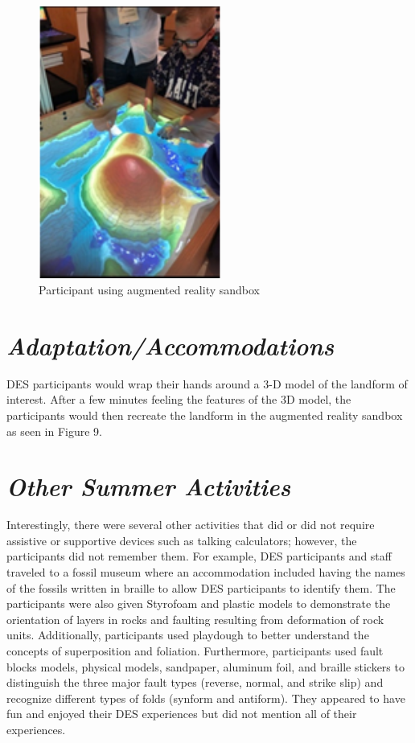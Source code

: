 \documentclass[11pt]{sig-alternate}
\begin{document}
\begin{large}
{\begin{figure}[htp] 
    \leftmargin
    \includegraphics[width=60mm]{figure9.png}
    \caption{Participant using augmented reality sandbox }
    \label{ Participant using augmented reality sandbox }
\end{figure}
}
\section*{\textit{Adaptation/Accommodations}}
 DES participants would wrap their hands around a 3-D model of the landform of interest. After a few minutes feeling the features of the 3D model, the participants would then recreate the landform in the augmented reality sandbox as seen in Figure 9.  
\section*{\textit{Other Summer Activities}}
Interestingly, there were several other activities that did or did not require assistive or supportive devices such as talking calculators; however, the participants did not remember them. For example, DES participants and staff traveled to a fossil museum where an accommodation included having the names of the fossils written in braille to allow DES participants to identify them.  The participants were also given Styrofoam and plastic models to demonstrate the orientation of layers in rocks and faulting resulting from deformation of rock units. Additionally, participants used playdough to better understand the concepts of superposition and foliation. Furthermore, participants used fault blocks models, physical models, sandpaper, aluminum foil, and braille stickers to distinguish the three major fault types (reverse, normal, and strike slip) and recognize different types of folds (synform and antiform).  They appeared to have fun and enjoyed their DES experiences but did not mention all of their experiences.

\end{large}
\end{document}
